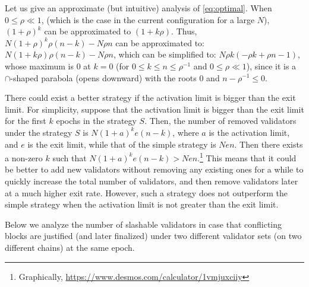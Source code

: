 \begin{remark}
Let us give an approximate (but intuitive) analysis of \eqref{eq:optimal}.
When $0 \le \rho \ll 1$, (which is the case in the current configuration for a large $N$), $(1+\rho)^k$ can be approximated to $(1+k\rho)$.
Thus,
$N(1+\rho)^k\rho(n-k) - N\rho n$
can be approximated to:
$N(1+k\rho)\rho(n-k) - N\rho n$,
which can be simplified to:
$N\rho k(-\rho k+\rho n-1)$,
whose maximum is 0 at $k = 0$ (for $0 \le k \le n \le \rho^{-1}$ and $0 \le \rho \ll 1$), since it is a $\cap$-shaped parabola (opens downward) with the roots 0 and $n - \rho^{-1} \le 0$.
\end{remark}

\begin{remark}
There could exist a better strategy if the activation limit is bigger than the exit limit.  For simplicity, suppose that the activation limit is bigger than the exit limit for the first $k$ epochs in the strategy $S$.  Then, the number of removed validators under the strategy $S$ is $N(1+a)^ke(n-k)$, where $a$ is the activation limit, and $e$ is the exit limit, while that of the simple strategy is $Nen$.  Then there exists a non-zero $k$ such that $N(1+a)^ke(n-k) > Nen$.\footnote{Graphically, \url{https://www.desmos.com/calculator/1vmjuxciiy}}  This means that it could be better to add new validators without removing any existing ones for a while to quickly increase the total number of validators, and then remove validators later at a much higher exit rate.  However, such a strategy does not outperform the simple strategy when the activation limit is not greater than the exit limit.
\end{remark}

Below we analyze the number of slashable validators in case that conflicting blocks are justified (and later finalized) under two different validator sets (on two different chains) at the same epoch.

